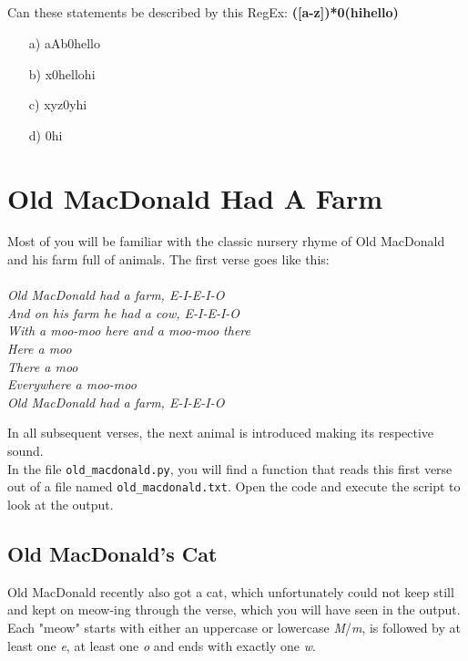 \subsection{}
Can these statements be described by this RegEx: \textbf{([a-z]\textbar [A-Z])*0(hi\textbar hello)}
\begin{itemize}
\item[a)] aAb0hello 
\item[b)] x0hellohi 
\item[c)] xyz0yhi 
\item[d)] 0hi 
\end{itemize}


\section{Old MacDonald Had A Farm}
Most of you will be familiar with the classic nursery rhyme of Old MacDonald and his farm full of animals. The first verse goes like this:\\\\
\textit{Old MacDonald had a farm, E-I-E-I-O\\
And on his farm he had a cow, E-I-E-I-O\\
With a moo-moo here and a moo-moo there\\
Here a moo\\
There a moo\\
Everywhere a moo-moo\\
Old MacDonald had a farm, E-I-E-I-O\\
}

\noindent In all subsequent verses, the next animal is introduced making its respective sound.\\
In the file \texttt{old\_macdonald.py}, you will find a function that reads this first verse out of a file named \texttt{old\_macdonald.txt}. Open the code and execute the script to look at the output.

\subsection{Old MacDonald's Cat}
Old MacDonald recently also got a cat, which unfortunately could not keep still and kept on meow-ing through the verse, which you will have seen in the output.\\
Each "meow" starts with either an uppercase or lowercase \textit{M}/\textit{m}, is followed by at least one \textit{e}, at least one \textit{o} and ends with exactly one \textit{w}.\\

